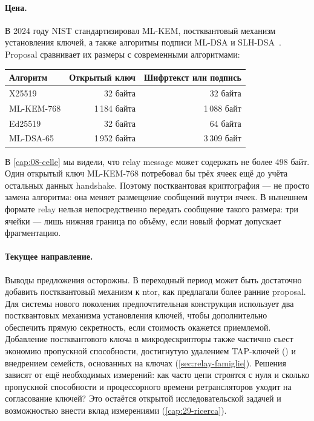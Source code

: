 \paragraph{Цена.} В 2024 году NIST стандартизировал ML-KEM, постквантовый механизм установления ключей, а также алгоритмы подписи ML-DSA и SLH-DSA~\cite{nistpqc2024}. Proposal сравнивает их размеры с современными алгоритмами:
\begin{center}\small
\begin{tabular}{@{}lrr@{}}
\toprule
Алгоритм & Открытый ключ & Шифртекст или подпись \\
\midrule
X25519 & 32 байта & 32 байта \\
ML-KEM-768 & 1\,184 байта & 1\,088 байт \\
Ed25519 & 32 байта & 64 байта \\
ML-DSA-65 & 1\,952 байта & 3\,309 байт \\
\bottomrule
\end{tabular}
\end{center}
В \cref{cap:08-celle} мы видели, что relay message может содержать не более 498 байт. Один открытый ключ ML-KEM-768 потребовал бы трёх ячеек ещё до учёта остальных данных handshake. Поэтому постквантовая криптография — не просто замена алгоритма: она меняет размещение сообщений внутри ячеек. В нынешнем формате relay нельзя непосредственно передать сообщение такого размера: три ячейки — лишь нижняя граница по объёму, если новый формат допускает фрагментацию.

\paragraph{Текущее направление.} Выводы предложения осторожны. В переходный период может быть достаточно добавить постквантовый механизм к ntor, как предлагали более ранние proposal. Для системы нового поколения предпочтительная конструкция использует два постквантовых механизма установления ключей, чтобы дополнительно обеспечить прямую секретность, если стоимость окажется приемлемой. Добавление постквантового ключа в микродескрипторы также частично съест экономию пропускной способности, достигнутую удалением TAP-ключей () и внедрением семейств, основанных на ключах (\cref{sec:relay-famiglie}). Решения зависят от ещё необходимых измерений: как часто цепи строятся с нуля и сколько пропускной способности и процессорного времени ретрансляторов уходит на согласование ключей? Это остаётся открытой исследовательской задачей и возможностью внести вклад измерениями (\cref{cap:29-ricerca}).

